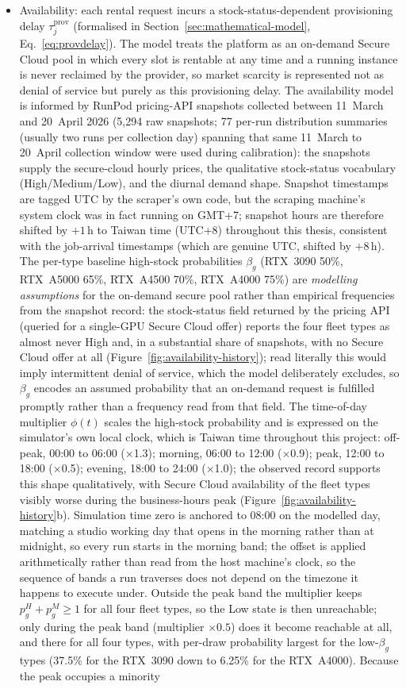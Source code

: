 {\begin{itemize}
  \item Availability: each rental request incurs a stock-status-dependent provisioning delay $\tau^{\text{prov}}_j$ (formalised in Section~\ref{sec:mathematical-model}, Eq.~\ref{eq:provdelay}). The model treats the platform as an on-demand Secure Cloud pool in which every slot is rentable at any time and a running instance is never reclaimed by the provider, so market scarcity is represented not as denial of service but purely as this provisioning delay. The availability model is informed by RunPod pricing-API snapshots collected between 11~March and 20~April 2026 (5,294 raw snapshots; 77 per-run distribution summaries (usually two runs per collection day) spanning that same 11~March to 20~April collection window were used during calibration): the snapshots supply the secure-cloud hourly prices, the qualitative stock-status vocabulary (High/Medium/Low), and the diurnal demand shape. Snapshot timestamps are tagged UTC by the scraper's own code, but the scraping machine's system clock was in fact running on GMT+7; snapshot hours are therefore shifted by $+1$\,h to Taiwan time (UTC+8) throughout this thesis, consistent with the job-arrival timestamps (which are genuine UTC, shifted by $+8$\,h). The per-type baseline high-stock probabilities $\beta_g$ (RTX~3090 50\%, RTX~A5000 65\%, RTX~A4500 70\%, RTX~A4000 75\%) are \emph{modelling assumptions} for the on-demand secure pool rather than empirical frequencies from the snapshot record: the stock-status field returned by the pricing API (queried for a single-GPU Secure Cloud offer) reports the four fleet types as almost never High and, in a substantial share of snapshots, with no Secure Cloud offer at all (Figure~\ref{fig:availability-history}); read literally this would imply intermittent denial of service, which the model deliberately excludes, so $\beta_g$ encodes an assumed probability that an on-demand request is fulfilled promptly rather than a frequency read from that field. The time-of-day multiplier $\phi(t)$ scales the high-stock probability and is expressed on the simulator's own local clock, which is Taiwan time throughout this project: off-peak, 00:00 to 06:00 ($\times$1.3); morning, 06:00 to 12:00 ($\times$0.9); peak, 12:00 to 18:00 ($\times$0.5); evening, 18:00 to 24:00 ($\times$1.0); the observed record supports this shape qualitatively, with Secure Cloud availability of the fleet types visibly worse during the business-hours peak (Figure~\ref{fig:availability-history}b). Simulation time zero is anchored to 08:00 on the modelled day, matching a studio working day that opens in the morning rather than at midnight, so every run starts in the morning band; the offset is applied arithmetically rather than read from the host machine's clock, so the sequence of bands a run traverses does not depend on the timezone it happens to execute under. Outside the peak band the multiplier keeps $p^{H}_g + p^{M}_g \ge 1$ for all four fleet types, so the Low state is then unreachable; only during the peak band (multiplier $\times 0.5$) does it become reachable at all, and there for all four types, with per-draw probability largest for the low-$\beta_g$ types (37.5\% for the RTX~3090 down to 6.25\% for the RTX~A4000). Because the peak occupies a minority 
\end{itemize}}
